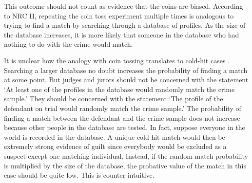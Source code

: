 \documentclass{article}
\begin{document}
This outcome should not count as evidence that the coins are biased. According to NRC II, repeating the coin toss experiment multiple times is analogous to trying to find a match by searching through a database of profiles.  As the size of the database increases,  %
 it is more likely that someone in the database who had nothing to do with the crime would  match.
%
%
%

It is unclear how the analogy with coin tossing translates to cold-hit cases \citep{donnelly1999DNADatabaseSearches}. Searching a larger database no doubt increases the probability of finding a match at some point. But judges and jurors should not be concerned with %
the statement
`At least one of the profiles in the database %
would randomly match the crime sample.' %
% 
%
They should be concerned with %
the statement `The profile of the  defendant on trial would randomly match the crime sample.' The probability of finding a match between the  defendant and the crime sample does not increase because other people in the database are tested. In fact, suppose everyone in the world is recorded in the database. A unique cold-hit match would then be extremely strong evidence of guilt since everybody would be excluded as a suspect except one matching individual. Instead, if the random match probability is multiplied by the size of the database, the probative value of the match in this case should be quite low. This is counter-intuitive.%
\end{document}
